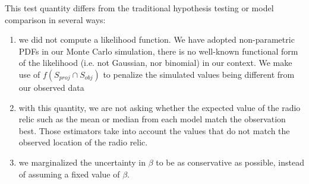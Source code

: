 This test quantity differs from the traditional hypothesis testing or model comparison in several ways: 
\begin{enumerate}
\item we did not compute a likelihood function.  We have adopted
non-parametric PDFs in our Monte Carlo simulation, there is no well-known
functional form of the likelihood (i.e. not Gaussian, nor binomial) in our context. We make use of $f(S_{proj} \cap S_{obj})$ to
penalize the simulated values being different from our observed data
\item with this quantity, we are not asking whether the expected value of
	the radio relic such as the mean or median from each model match the
	observation best. Those estimators take into account the values that do not match the observed location of the radio relic. 
\item we marginalized the uncertainty in $\beta$ to be as conservative
	as possible, instead of assuming a fixed value of $\beta$.
\end{enumerate} \par



\bsp 
\label{lastpage} 

